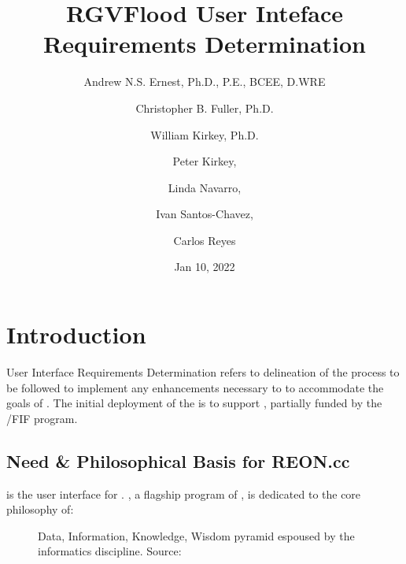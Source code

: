 \documentclass[letterpaper,12pt,english]{sphinxmanual}
\title{RGVFlood User Inteface Requirements Determination}
\date{Jan 10, 2022}
\author{Andrew N.S. Ernest, Ph.D., P.E., BCEE, D.WRE \and Christopher B. Fuller, Ph.D. \and William Kirkey, Ph.D. \and Peter Kirkey, \and Linda Navarro, \and Ivan Santos-Chavez, \and Carlos Reyes}
\begin{document}
\pagestyle{empty}
\sphinxmaketitle
\pagestyle{plain}
\sphinxtableofcontents
\pagestyle{normal}
\label{\detokenize{requirements/index::doc}}



\chapter{Introduction}
\label{\detokenize{requirements/introduction/index:introduction}}\label{\detokenize{requirements/introduction/index::doc}}
\sphinxAtStartPar
User Interface Requirements Determination refers to delineation of the process to be followed to implement any enhancements necessary to  to accommodate the goals of . The initial deployment of the  is to support , partially funded by the /FIF program.


\section{Need \& Philosophical Basis for REON.cc}
\label{\detokenize{requirements/introduction/need:need-philosophical-basis-for-reon-cc}}\label{\detokenize{requirements/introduction/need::doc}}
\sphinxAtStartPar
{} is the user interface for . , a flagship program of , is dedicated to the core philosophy of:

\sphinxAtStartPar
{}

\begin{figure}[htbp]
\centering
\capstart

\noindent{}
\caption{Data, Information, Knowledge, Wisdom pyramid espoused by the informatics discipline. Source: }\label{\detokenize{requirements/introduction/need:id1}}\end{figure}
\end{document}
